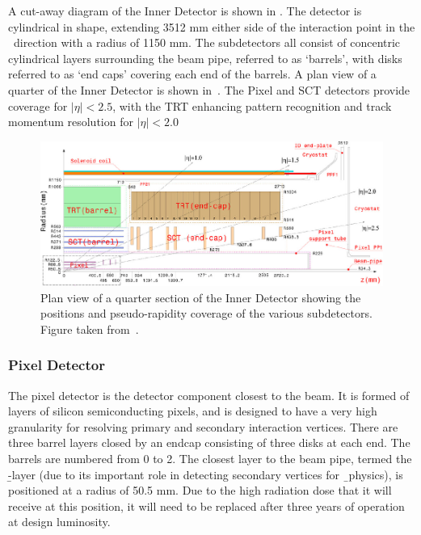 A cut-away diagram of the Inner Detector is shown in . The detector
is cylindrical in shape, extending 3512 mm either side of the interaction point
in the \z\ direction with a radius of 1150 mm. The subdetectors all consist of
concentric cylindrical layers surrounding the beam pipe, referred to as
`barrels', with disks referred to as `end caps' covering each end of the
barrels. A plan view of a quarter of the Inner Detector is shown
in~. The Pixel and SCT detectors provide coverage for $|\eta|<2.5$,
with the TRT enhancing pattern recognition and track momentum resolution for
$|\eta|<2.0$

\begin{figure}[h]
\centering
\includegraphics[width=\textwidth]{FigID26-mod-011107_crop}
\caption[Plan view of a quarter section of the Inner Detector showing the
positions and pseudo-rapidity coverage of the various subdetectors.]{Plan view of a quarter section of the Inner Detector showing the
positions and pseudo-rapidity coverage of the various subdetectors. Figure taken from~\cite{Aad:1125884}.}
\label{fig:id-plan}
\end{figure}

\subsubsection{Pixel Detector}

The pixel detector is the detector component closest to the beam. It is formed
of layers of silicon semiconducting pixels, and is designed to have a very
high granularity for resolving primary and secondary interaction vertices. There
are three barrel layers closed by an endcap consisting of three disks at each
end. The barrels are numbered from 0 to 2. The closest layer to the beam
pipe, termed the \b-layer (due to its important role in detecting secondary
vertices for \b\ physics), is
positioned at a radius of 50.5 mm. Due to the high radiation dose that it will
receive at this position, it will need to be replaced after three years of operation at design luminosity.

